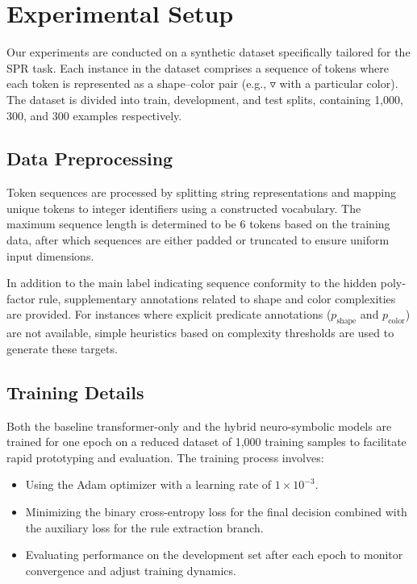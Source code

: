 \documentclass{article}
\begin{document}
\section{Experimental Setup}
Our experiments are conducted on a synthetic dataset specifically tailored for the SPR task. Each instance in the dataset comprises a sequence of tokens where each token is represented as a shape–color pair (e.g., \(\triangledown\) with a particular color). The dataset is divided into train, development, and test splits, containing 1,000, 300, and 300 examples respectively.

\subsection{Data Preprocessing}
Token sequences are processed by splitting string representations and mapping unique tokens to integer identifiers using a constructed vocabulary. The maximum sequence length is determined to be 6 tokens based on the training data, after which sequences are either padded or truncated to ensure uniform input dimensions.

In addition to the main label indicating sequence conformity to the hidden poly‐factor rule, supplementary annotations related to shape and color complexities are provided. For instances where explicit predicate annotations (\( p_{\text{shape}} \) and \( p_{\text{color}} \)) are not available, simple heuristics based on complexity thresholds are used to generate these targets.

\subsection{Training Details}
Both the baseline transformer-only and the hybrid neuro-symbolic models are trained for one epoch on a reduced dataset of 1,000 training samples to facilitate rapid prototyping and evaluation. The training process involves:
\begin{itemize}
    \item Using the Adam optimizer with a learning rate of \( 1 \times 10^{-3} \).
    \item Minimizing the binary cross-entropy loss for the final decision combined with the auxiliary loss for the rule extraction branch.
    \item Evaluating performance on the development set after each epoch to monitor convergence and adjust training dynamics.
\end{itemize}
\end{document}
